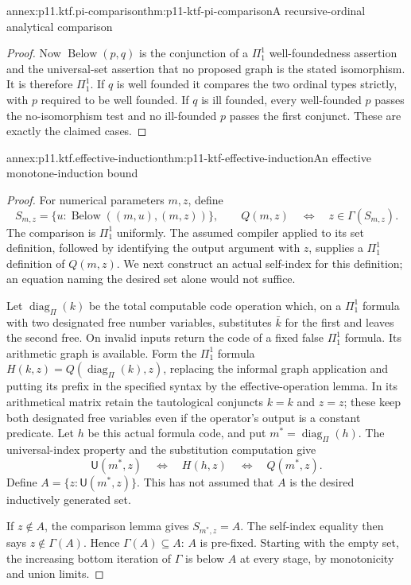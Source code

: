 \begin{annexitem}{annex:p11.ktf.pi-comparison}{thm:p11-ktf-pi-comparison}{A recursive-ordinal analytical comparison}
\begin{proof}
Now \(\operatorname{Below}(p,q)\) is the conjunction of a
\(\Pi^1_1\) well-foundedness assertion and the universal-set
assertion that no proposed graph is the stated isomorphism. It is
therefore \(\Pi^1_1\). If \(q\) is well founded it compares
the two ordinal types strictly, with \(p\) required to be well
founded. If \(q\) is ill founded, every well-founded \(p\)
passes the no-isomorphism test and no ill-founded \(p\) passes
the first conjunct. These are exactly the claimed cases.
\end{proof}
\end{annexitem}

\begin{annexitem}{annex:p11.ktf.effective-induction}{thm:p11-ktf-effective-induction}{An effective monotone-induction bound}
\begin{proof}
For numerical parameters \(m,z\), define
\[
 S_{m,z}=\{u:\operatorname{Below}((m,u),(m,z))\},\qquad
 Q(m,z)\quad\Longleftrightarrow\quad z\in\Gamma(S_{m,z}).
\]
The comparison is \(\Pi^1_1\) uniformly. The assumed compiler
applied to its set definition, followed by identifying the output
argument with \(z\), supplies a \(\Pi^1_1\) definition of
\(Q(m,z)\). We next construct an actual self-index for this
definition; an equation naming the desired set alone would not suffice.

Let \(\operatorname{diag}_{\Pi}(k)\) be the total computable
code operation which, on a \(\Pi^1_1\) formula with two designated
free number variables, substitutes \(\bar k\) for the first and
leaves the second free. On invalid inputs return the code of a fixed
false \(\Pi^1_1\) formula. Its arithmetic graph is available.
Form the \(\Pi^1_1\) formula
\(H(k,z)=Q(\operatorname{diag}_{\Pi}(k),z)\), replacing the
informal graph application and putting its prefix in the specified
syntax by the effective-operation lemma. In its arithmetical matrix
retain the tautological conjuncts \(k=k\) and \(z=z\); these keep
both designated free variables even if the operator's output is a
constant predicate. Let \(h\) be this actual
formula code, and put \(m^*=\operatorname{diag}_{\Pi}(h)\).
The universal-index property and the substitution computation give
\[
 \mathsf U(m^*,z)\quad\Longleftrightarrow\quad
 H(h,z)\quad\Longleftrightarrow\quad Q(m^*,z).
\]
Define \(A=\{z:\mathsf U(m^*,z)\}\). This has not assumed
that \(A\) is the desired inductively generated set.

If \(z\notin A\), the comparison lemma gives
\(S_{m^*,z}=A\). The self-index equality then says
\(z\notin\Gamma(A)\). Hence \(\Gamma(A)\subseteq A\):
\(A\) is pre-fixed. Starting with the empty set, the increasing
bottom iteration of \(\Gamma\) is below \(A\) at every stage,
by monotonicity and union limits.


\end{proof}
\end{annexitem}
